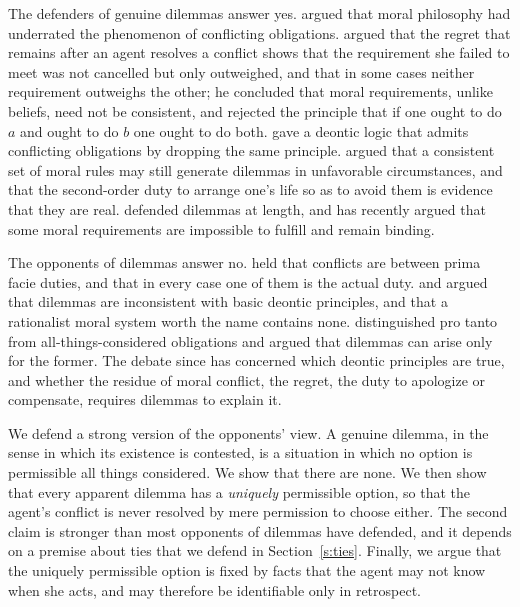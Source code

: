 \documentclass{situationist-preprint}
\begin{document}
The defenders of genuine dilemmas answer yes. \citet{Lemmon1962} argued that moral philosophy had underrated the phenomenon of conflicting obligations. \citet{Williams1965} argued that the regret that remains after an agent resolves a conflict shows that the requirement she failed to meet was not cancelled but only outweighed, and that in some cases neither requirement outweighs the other; he concluded that moral requirements, unlike beliefs, need not be consistent, and rejected the principle that if one ought to do $a$ and ought to do $b$ one ought to do both. \citet{vanFraassen1973} gave a deontic logic that admits conflicting obligations by dropping the same principle. \citet{Marcus1980} argued that a consistent set of moral rules may still generate dilemmas in unfavorable circumstances, and that the second-order duty to arrange one's life so as to avoid them is evidence that they are real. \citet{SinnottArmstrong1988} defended dilemmas at length, and \citet{Tessman2015} has recently argued that some moral requirements are impossible to fulfill and remain binding.

The opponents of dilemmas answer no. \citet{Ross1930} held that conflicts are between prima facie duties, and that in every case one of them is the actual duty. \citet{McConnell1978} and \citet{Conee1982} argued that dilemmas are inconsistent with basic deontic principles, and \citet{Donagan1984} that a rationalist moral system worth the name contains none. \citet{Brink1994} distinguished pro tanto from all-things-considered obligations and argued that dilemmas can arise only for the former. The debate since has concerned which deontic principles are true, and whether the residue of moral conflict, the regret, the duty to apologize or compensate, requires dilemmas to explain it.

We defend a strong version of the opponents' view. A genuine dilemma, in the sense in which its existence is contested, is a situation in which no option is permissible all things considered. We show that there are none. We then show that every apparent dilemma has a \emph{uniquely} permissible option, so that the agent's conflict is never resolved by mere permission to choose either. The second claim is stronger than most opponents of dilemmas have defended, and it depends on a premise about ties that we defend in Section~\ref{s:ties}. Finally, we argue that the uniquely permissible option is fixed by facts that the agent may not know when she acts, and may therefore be identifiable only in retrospect.
\end{document}
